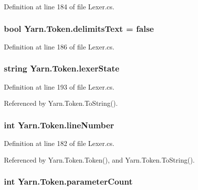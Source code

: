 Definition at line 184 of file Lexer.\-cs.

\hypertarget{a00175_af15d26fa4e6f276ab58ff66d3c4203da}{
\subsubsection[{delimits\-Text}]{\setlength{\rightskip}{0pt plus 5cm}bool Yarn.\-Token.\-delimits\-Text = false}}\label{a00175_af15d26fa4e6f276ab58ff66d3c4203da}


Definition at line 186 of file Lexer.\-cs.

\hypertarget{a00175_a710099e7abe84f30864a320cc7464214}{
\subsubsection[{lexer\-State}]{\setlength{\rightskip}{0pt plus 5cm}string Yarn.\-Token.\-lexer\-State}}\label{a00175_a710099e7abe84f30864a320cc7464214}


Definition at line 193 of file Lexer.\-cs.



Referenced by Yarn.\-Token.\-To\-String().

\hypertarget{a00175_a80fe710713201bb793a41452e314a721}{
\subsubsection[{line\-Number}]{\setlength{\rightskip}{0pt plus 5cm}int Yarn.\-Token.\-line\-Number}}\label{a00175_a80fe710713201bb793a41452e314a721}


Definition at line 182 of file Lexer.\-cs.



Referenced by Yarn.\-Token.\-Token(), and Yarn.\-Token.\-To\-String().

\hypertarget{a00175_adf11c0d29b66935a8d8109d6308d0488}{
\subsubsection[{parameter\-Count}]{\setlength{\rightskip}{0pt plus 5cm}int Yarn.\-Token.\-parameter\-Count}}\label{a00175_adf11c0d29b66935a8d8109d6308d0488}


